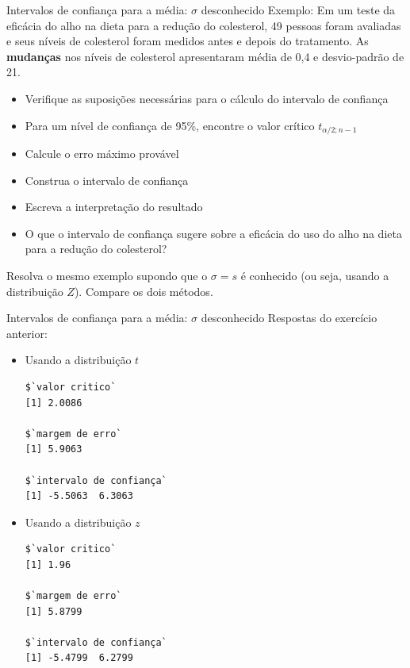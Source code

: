 \documentclass[10pt]{beamer}\usepackage[]{graphicx}\usepackage[]{color}
\makeatletter
\newenvironment{kframe}{%
 \def\at@end@of@kframe{}%
 \ifinner\ifhmode%
  \def\at@end@of@kframe{\end{minipage}}%
  \begin{minipage}{\columnwidth}%
 \fi\fi%
 \def\FrameCommand##1{\hskip\@totalleftmargin \hskip-\fboxsep
 \colorbox{shadecolor}{##1}\hskip-\fboxsep
     \hskip-\linewidth \hskip-\@totalleftmargin \hskip\columnwidth}%
 \MakeFramed {\advance\hsize-\width
   \@totalleftmargin\z@ \linewidth\hsize
   \@setminipage}}%
 {\par\unskip\endMakeFramed%
 \at@end@of@kframe}
\newenvironment{knitrout}{}{} %
\theoremstyle{definition}
\makeatother
\begin{document}
\begin{frame}{Intervalos de confiança para a média: $\sigma$ desconhecido}
  Exemplo: Em um teste da eficácia do alho na dieta para a redução do
  colesterol, 49 pessoas foram avaliadas e seus níveis de colesterol
  foram medidos antes e depois do tratamento. As \textbf{mudanças} nos
  níveis de colesterol apresentaram média de 0,4 e desvio-padrão de
  21.

  \begin{itemize}
  \item[a)] Verifique as suposições necessárias para o cálculo do intervalo
    de confiança
  \item[b)] Para um nível de confiança de 95\%, encontre o valor crítico
    $t_{\alpha/2;n-1}$
  \item[c)] Calcule o erro máximo provável
  \item[d)] Construa o intervalo de confiança
  \item[e)] Escreva a interpretação do resultado
  \item[f)] O que o intervalo de confiança sugere sobre a eficácia do uso do
    alho na dieta para a redução do colesterol?
  \end{itemize}
  Resolva o mesmo exemplo supondo que o $\sigma = s$ é conhecido (ou
  seja, usando a distribuição $Z$). Compare os dois métodos.
\end{frame}

\begin{frame}[fragile]{Intervalos de confiança para a média: $\sigma$ desconhecido}
Respostas do exercício anterior:
\begin{itemize}
\item Usando a distribuição $t$
\begin{knitrout}\footnotesize
{}\color{fgcolor}\begin{kframe}
\begin{verbatim}
$`valor critico`
[1] 2.0086

$`margem de erro`
[1] 5.9063

$`intervalo de confiança`
[1] -5.5063  6.3063
\end{verbatim}
\end{kframe}
\end{knitrout}
\item Usando a distribuição $z$
\begin{knitrout}\footnotesize
{}\color{fgcolor}\begin{kframe}
\begin{verbatim}
$`valor critico`
[1] 1.96

$`margem de erro`
[1] 5.8799

$`intervalo de confiança`
[1] -5.4799  6.2799
\end{verbatim}
\end{kframe}
\end{knitrout}
\end{itemize}
\end{frame}
\end{document}
